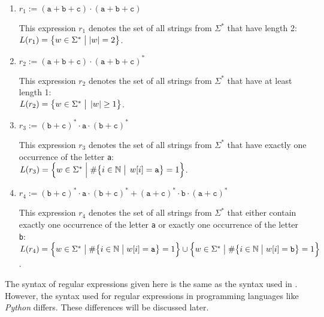 \begin{enumerate}
\item $ r_1 := (\texttt{a} + \texttt{b} + \texttt{c}) \cdot (\texttt{a} + \texttt{b} + \texttt{c}) $

      This expression $ r_1 $ denotes the set of all strings from $\Sigma^*$ that have length 2:
      \\[0.2cm]
      \hspace*{1.3cm}
      $ L(r_1) = \bigl\{ w \in \Sigma^* \bigm| |w| = 2 \bigr\}$.
\item $ r_2 := (\texttt{a} + \texttt{b} + \texttt{c}) \cdot (\texttt{a} + \texttt{b} + \texttt{c})^* $

      This expression $ r_2 $ denotes the set of all strings from $\Sigma^*$ that have at least length 1:
      \\[0.2cm]
      \hspace*{1.3cm}
      $L(r_2) = \bigl\{ w \in \Sigma^* \bigm|\, |w| \geq 1 \bigr\}$.
\item $ r_3 := (\texttt{b} + \texttt{c})^* \cdot \texttt{a} \cdot (\texttt{b} + \texttt{c})^* $

      This expression $ r_3 $ denotes the set of all strings from $\Sigma^*$ that have exactly one occurrence of the letter \texttt{a}:
      \\[0.2cm]
      \hspace*{1.3cm}
      $L(r_3) = \Bigl\{ w \in \Sigma^* \Bigm| \#\bigl\{i \in \mathbb{N} \bigm|\, w[i] = \texttt{a} \bigr\} = 1 \Bigr\}$. 
\item $ r_4 :=  (\texttt{b} + \texttt{c})^* \cdot \texttt{a} \cdot (\texttt{b} + \texttt{c})^* + (\texttt{a} + \texttt{c})^* \cdot \texttt{b} \cdot (\texttt{a} + \texttt{c})^* $

      This expression $ r_4 $ denotes the set of all strings from $\Sigma^*$ that either contain exactly one
      occurrence of the letter \texttt{a} or exactly one occurrence of the letter \texttt{b}: 
      \\[0.2cm]
      \hspace*{1.3cm}
      $L(r_4) = \Bigl\{ w \in \Sigma^* \bigm| \#\bigl\{i \in \mathbb{N} \bigm| w[i] = \texttt{a} \bigr\} = 1
      \Bigr\} \cup \Bigl\{ w \in \Sigma^* \bigm| \#\bigl\{i \in \mathbb{N} \bigm| w[i] = \texttt{b} \bigr\} = 1
      \Bigr\}$.  \eox
\end{enumerate}

\remarkEng
The syntax of regular expressions given here is the same as the syntax used in \cite{hopcroft:06}. However, the
syntax used for regular expressions in programming languages like \textsl{Python} differs. These differences
will be discussed later. 
\eox


